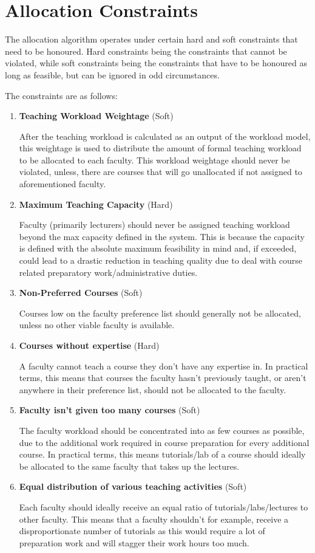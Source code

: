 \section{Allocation Constraints}

The allocation algorithm operates under certain hard and soft constraints that need to be honoured. Hard constraints being the constraints that cannot be violated, while soft constraints being the constraints that have to be honoured as long as feasible, but can be ignored in odd circumstances.

The constraints are as follows:
\begin{enumerate}
\item \textbf{Teaching Workload Weightage} (Soft)

After the teaching workload is calculated as an output of the workload model, this weightage is used to distribute the amount of formal teaching workload to be allocated to each faculty. This workload weightage should never be violated, unless, there are courses that will go unallocated if not assigned to aforementioned faculty.

\item \textbf{Maximum Teaching Capacity} (Hard)

Faculty (primarily lecturers) should never be assigned teaching workload beyond the max capacity defined in the system. This is because the capacity is defined with the absolute maximum feasibility in mind and, if exceeded, could lead to a drastic reduction in teaching quality due to deal with course related preparatory work/administrative duties.

\item \textbf{Non-Preferred Courses} (Soft)

Courses low on the faculty preference list should generally not be allocated, unless no other viable faculty is available.

\item \textbf{Courses without expertise} (Hard)

A faculty cannot teach a course they don't have any expertise in. In practical terms, this means that courses the faculty hasn't previously taught, or aren't anywhere in their preference list, should not be allocated to the faculty.

\item \textbf{Faculty isn't given too many courses} (Soft)

The faculty workload should be concentrated into as few courses as possible, due to the additional work required in course preparation for every additional course. In practical terms, this means tutorials/lab of a course should ideally be allocated to the same faculty that takes up the lectures.

\item \textbf{Equal distribution of various teaching activities} (Soft)

Each faculty should ideally receive an equal ratio of tutorials/labs/lectures to other faculty. This means that a faculty shouldn't for example, receive a disproportionate number of tutorials as this would require a lot of preparation work and will stagger their work hours too much.
\end{enumerate}
